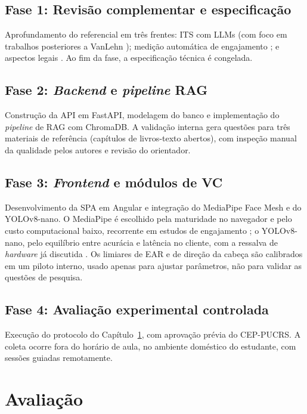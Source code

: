 \documentclass[12pt,a4paper]{article}
\begin{document}
\subsection{Fase 1: Revisão complementar e especificação}
Aprofundamento do referencial em três frentes: ITS com LLMs (com foco em trabalhos posteriores a VanLehn \cite{Van11}); medição automática de engajamento \cite{DDD17,AK24,DD25}; e aspectos legais \cite{Bra18}. Ao fim da fase, a especificação técnica é congelada.

\subsection{Fase 2: \emph{Backend} e \emph{pipeline} RAG}
Construção da API em FastAPI, modelagem do banco e implementação do \emph{pipeline} de RAG com ChromaDB. A validação interna gera questões para três materiais de referência (capítulos de livros-texto abertos), com inspeção manual da qualidade pelos autores e revisão do orientador.

\subsection{Fase 3: \emph{Frontend} e módulos de VC}
Desenvolvimento da SPA em Angular e integração do MediaPipe Face Mesh e do YOLOv8-nano. O MediaPipe é escolhido pela maturidade no navegador e pelo custo computacional baixo, recorrente em estudos de engajamento \cite{LTN19,AK24,DD25}; o YOLOv8-nano, pelo equilíbrio entre acurácia e latência no cliente, com a ressalva de \emph{hardware} já discutida \cite{JCQ23}. Os limiares de EAR e de direção da cabeça são calibrados em um piloto interno, usado apenas para ajustar parâmetros, não para validar as questões de pesquisa.

\subsection{Fase 4: Avaliação experimental controlada}
Execução do protocolo do Capítulo~\ref{sec:aval}, com aprovação prévia do CEP-PUCRS. A coleta ocorre fora do horário de aula, no ambiente doméstico do estudante, com sessões guiadas remotamente.

\section{Avaliação}\label{sec:aval}
\end{document}
